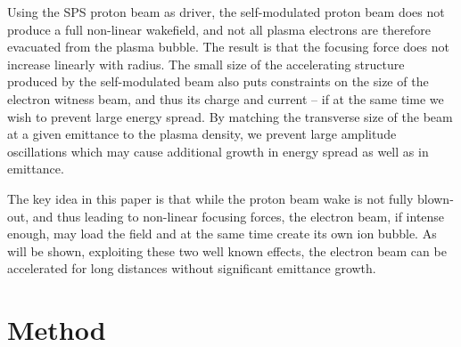 \documentclass[aps,prstab,reprint,amsmath,amssymb,groupedaddress]{revtex4-1}
\newcommand{\unit}[1]{\,\mathrm{#1}}
\begin{document}
Using the SPS proton beam as driver, the self-modulated proton beam does not produce a full non-linear wakefield, and
not all plasma electrons are therefore evacuated from the plasma bubble. The result is that the focusing force does not
increase linearly with radius. The small size of the accelerating structure produced by the self-modulated beam also
puts constraints on the size of the electron witness beam, and thus its charge and current -- if at the same time we
wish to prevent large energy spread. By matching the transverse size of the beam at a given emittance to the plasma
density, we prevent large amplitude oscillations which may cause additional growth in energy spread as well as in
emittance.

The key idea in this paper is that while the proton beam wake is not fully blown-out, and thus leading to non-linear
focusing forces, the electron beam, if intense enough, may load the field and at the same time create its own ion
bubble. As will be shown, exploiting these two well known effects, the electron beam can be accelerated for long
distances without significant emittance growth.


\section[\label{S:M}]{Method}
\end{document}
